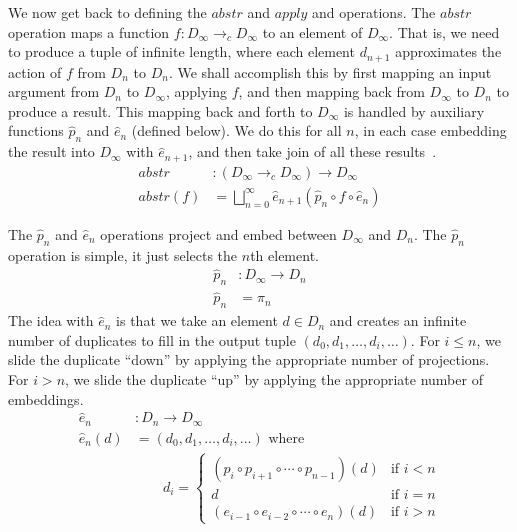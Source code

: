 \documentclass{tufte-handout}
\begin{document}
We now get back to defining the $\mathit{abstr}$ and $\mathit{apply}$
and operations. The $\mathit{abstr}$ operation maps a function $f :
D_{\infty} \to_c D_{\infty}$ to an element of $D_\infty$.  That is, we
need to produce a tuple of infinite length, where each element
$d_{n+1}$ approximates the action of $f$ from $D_n$ to $D_n$.
%
We shall accomplish this by first mapping an input argument from $D_n$
to $D_\infty$, applying $f$, and then mapping back from $D_\infty$ to
$D_n$ to produce a result. This mapping back and forth to $D_\infty$
is handled by auxiliary functions $\hat{p}_n$ and $\hat{e}_n$ (defined
below).  We do this for all $n$, in each case embedding the result
into $D_\infty$ with $\hat{e}_{n+1}$, and then take join of all these
results~\citep{Scott:1971aa,barendregt84:_lambda_calculus}.
\begin{align*}
 \mathit{abstr} &: (D_{\infty} \to_c D_{\infty}) \to D_{\infty}\\
 \mathit{abstr}(f) &= \bigsqcup_{n=0}^{\infty} \hat{e}_{n+1}(\hat{p}_n \circ f \circ \hat{e}_n)
\end{align*}

The $\hat{p}_n$ and $\hat{e}_n$ operations project and embed between
$D_\infty$ and $D_n$.  The $\hat{p}_n$ operation is simple, it just
selects the $n$th element.
\begin{align*}
 \hat{p}_n &: D_\infty \to D_n \\
 \hat{p}_n &= \pi_n
\end{align*}
The idea with $\hat{e}_n$ is that we take an element $d \in D_n$ and
creates an infinite number of duplicates to fill in the output tuple
$(d_0, d_1, \ldots, d_i, \ldots)$. For $i \leq n$, we slide the
duplicate ``down'' by applying the appropriate number of projections.
For $i > n$, we slide the duplicate ``up'' by applying the appropriate
number of embeddings.
\begin{align*}
 \hat{e}_n &: D_n \to D_\infty \\
 \hat{e}_n(d) &= (d_0, d_1, \ldots, d_i, \ldots) \text{ where} \\
  & \qquad d_i = 
  \begin{cases}
    (p_i \circ p_{i+1} \circ \cdots \circ p_{n-1})(d) & \text{if } i < n \\
    d & \text{if } i = n \\
    (e_{i-1} \circ e_{i-2} \circ \cdots \circ e_n)(d) & \text{if } i > n
  \end{cases}
\end{align*}
\end{document}
